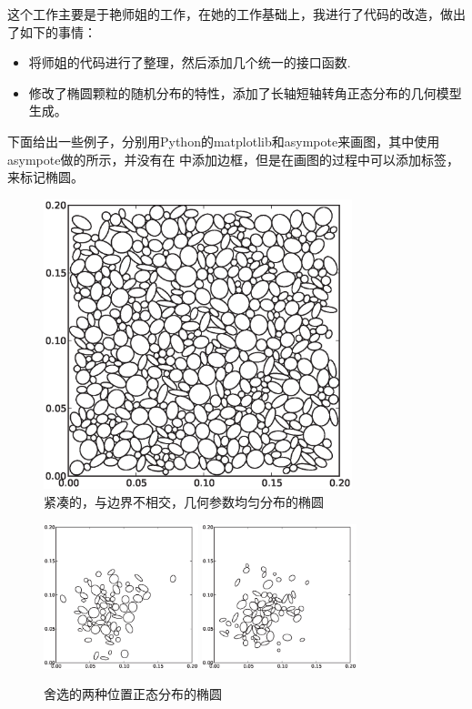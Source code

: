这个工作主要是于艳师姐的工作，在她的工作基础上，我进行了代码的改造，做出了如下的事情：
\begin{itemize}
	\item 将师姐的代码进行了整理，然后添加几个统一的接口函数.
	\item 修改了椭圆颗粒的随机分布的特性，添加了长轴短轴转角正态分布的几何模型生成。
\end{itemize}
下面给出一些例子，分别用Python的matplotlib和asympote来画图，其中使用
asympote做的所示，并没有在
中添加边框，但是在画图的过程中可以添加标签，来标记椭圆。
\begin{figure}[htbp]
	\begin{center}
		\includegraphics[width=0.8\textwidth]{pics/norm_destribution_1.eps}
	\end{center}
	\caption{紧凑的，与边界不相交，几何参数均匀分布的椭圆}
	\label{fig:normal1}
\end{figure}
\begin{figure}[htbp]
	\begin{center}
		\includegraphics[width=0.4\textwidth]{pics/norm_destribution_2.eps}
		\includegraphics[width=0.4\textwidth]{pics/norm_destribution_3.eps}
	\end{center}
	\caption{舍选的两种位置正态分布的椭圆}
	\label{fig:normalshexuan}
\end{figure}
